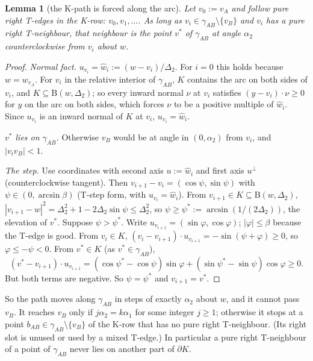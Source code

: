 \documentclass[11pt]{amsart}
\newtheorem{lemma}[theorem]{Lemma}
\theoremstyle{definition}
\theoremstyle{remark}
\newcommand{\Dt}{\Delta_2}
\newcommand{\Dd}{\mathrm{B}}      %
\begin{document}
\begin{lemma}[the K-path is forced along the arc]\label{lem:rigid}
Let $v_0:=v_A$ and follow pure right T-edges in the K-row: $v_0,v_1,\dots$. As long as $v_i\in\gamma_{AB}\setminus\{v_B\}$ and $v_i$ has a pure right T-neighbour, that neighbour is the point $v^*$ of $\gamma_{AB}$ at angle $\alpha_2$ counterclockwise from $v_i$ about $w$.
\end{lemma}
\begin{proof}
\emph{Normal fact.} $u_{v_i}=\hat w_i:=(w-v_i)/\Dt$. For $i=0$ this holds because $w=w_{v_A}$. For $v_i$ in the relative interior of $\gamma_{AB}$, $K$ contains the arc on both sides of $v_i$, and $K\subseteq\Dd(w,\Dt)$; so every inward normal $\nu$ at $v_i$ satisfies $(y-v_i)\cdot\nu\ge0$ for $y$ on the arc on both sides, which forces $\nu$ to be a positive multiple of $\hat w_i$. Since $u_{v_i}$ is an inward normal of $K$ at $v_i$, $u_{v_i}=\hat w_i$.

\emph{$v^*$ lies on $\gamma_{AB}$.} Otherwise $v_B$ would be at angle in $(0,\alpha_2)$ from $v_i$, and $|v_iv_B|<1$.

\emph{The step.} Use coordinates with second axis $u:=\hat w_i$ and first axis $u^\perp$ (counterclockwise tangent). Then $v_{i+1}-v_i=(\cos\psi,\sin\psi)$ with $\psi\in(0,\arcsin\beta)$ (T-step form, with $u_{v_i}=\hat w_i$). From $v_{i+1}\in K\subseteq\Dd(w,\Dt)$, $|v_{i+1}-w|^2=\Dt^2+1-2\Dt\sin\psi\le\Dt^2$, so $\psi\ge\psi^*:=\arcsin(1/(2\Dt))$, the elevation of $v^*$. Suppose $\psi>\psi^*$. Write $u_{v_{i+1}}=(\sin\varphi,\cos\varphi)$; $|\varphi|\le\beta$ because the T-edge is good. From $v_i\in K$, $(v_i-v_{i+1})\cdot u_{v_{i+1}}=-\sin(\psi+\varphi)\ge0$, so $\varphi\le-\psi<0$. From $v^*\in K$ (as $v^*\in\gamma_{AB}$),
\[
(v^*-v_{i+1})\cdot u_{v_{i+1}}=(\cos\psi^*-\cos\psi)\sin\varphi+(\sin\psi^*-\sin\psi)\cos\varphi\ge0 .
\]
But both terms are negative. So $\psi=\psi^*$ and $v_{i+1}=v^*$.
\end{proof}

So the path moves along $\gamma_{AB}$ in steps of exactly $\alpha_2$ about $w$, and it cannot pass $v_B$. It reaches $v_B$ only if $j\alpha_2=k\alpha_1$ for some integer $j\ge1$; otherwise it stops at a point $b_{AB}\in\gamma_{AB}\setminus\{v_B\}$ of the K-row that has no pure right T-neighbour. (Its right slot is unused or used by a mixed T-edge.) In particular a pure right T-neighbour of a point of $\gamma_{AB}$ never lies on another part of $\partial K$.
\end{document}
